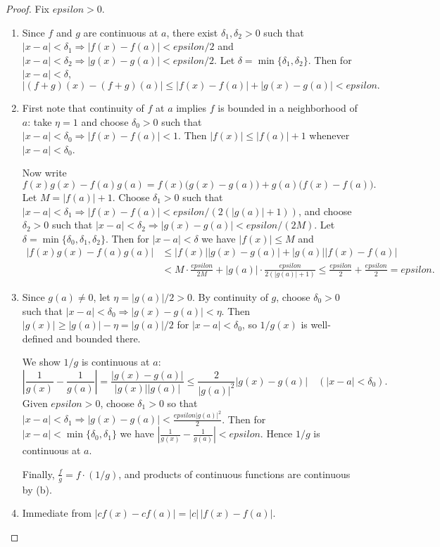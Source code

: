 \documentclass[12pt]{article}
\numberwithin{equation}{section}
\def\abs#1{|#1|}
\def\eps{epsilon}
\DeclarePairedDelimiter{\abs}{\lvert}{\rvert}
\newcommand{\eps}{\varepsilon}               %
\theoremstyle{plain}
\theoremstyle{definition}
\theoremstyle{remark}
\begin{document}
\begin{proof}
Fix $\eps>0$.
\begin{enumerate}[label=(\alph*)]
\item Since $f$ and $g$ are continuous at $a$, there exist $\delta_1,\delta_2>0$ such that
$\abs{x-a}<\delta_1\Rightarrow \abs{f(x)-f(a)}<\eps/2$ and
$\abs{x-a}<\delta_2\Rightarrow \abs{g(x)-g(a)}<\eps/2$.
Let $\delta=\min\{\delta_1,\delta_2\}$. Then for $\abs{x-a}<\delta$,
\[
\abs{(f+g)(x)-(f+g)(a)}\le \abs{f(x)-f(a)}+\abs{g(x)-g(a)}<\eps.
\]

\item First note that continuity of $f$ at $a$ implies $f$ is bounded in a neighborhood of $a$:
take $\eta=1$ and choose $\delta_0>0$ such that $\abs{x-a}<\delta_0\Rightarrow \abs{f(x)-f(a)}<1$.
Then $\abs{f(x)}\le \abs{f(a)}+1$ whenever $\abs{x-a}<\delta_0$.

Now write
\[
f(x)g(x)-f(a)g(a)
= f(x)\bigl(g(x)-g(a)\bigr)+g(a)\bigl(f(x)-f(a)\bigr).
\]
Let $M=\abs{f(a)}+1$.
Choose $\delta_1>0$ such that $\abs{x-a}<\delta_1\Rightarrow \abs{f(x)-f(a)}<\eps/(2(\abs{g(a)}+1))$,
and choose $\delta_2>0$ such that $\abs{x-a}<\delta_2\Rightarrow \abs{g(x)-g(a)}<\eps/(2M)$.
Let $\delta=\min\{\delta_0,\delta_1,\delta_2\}$.
Then for $\abs{x-a}<\delta$ we have $\abs{f(x)}\le M$ and
\begin{align*}
\abs{f(x)g(x)-f(a)g(a)}
&\le \abs{f(x)}\abs{g(x)-g(a)}+\abs{g(a)}\abs{f(x)-f(a)}\\
&< M\cdot \frac{\eps}{2M} + \abs{g(a)}\cdot \frac{\eps}{2(\abs{g(a)}+1)}
\le \frac{\eps}{2}+\frac{\eps}{2}=\eps.
\end{align*}

\item Since $g(a)\neq 0$, let $\eta=\abs{g(a)}/2>0$.
By continuity of $g$, choose $\delta_0>0$ such that $\abs{x-a}<\delta_0\Rightarrow \abs{g(x)-g(a)}<\eta$.
Then $\abs{g(x)}\ge \abs{g(a)}-\eta=\abs{g(a)}/2$ for $\abs{x-a}<\delta_0$,
so $1/g(x)$ is well-defined and bounded there.

We show $1/g$ is continuous at $a$:
\[
\left|\frac{1}{g(x)}-\frac{1}{g(a)}\right|
=\frac{\abs{g(x)-g(a)}}{\abs{g(x)}\abs{g(a)}}
\le \frac{2}{\abs{g(a)}^2}\abs{g(x)-g(a)}
\quad (\abs{x-a}<\delta_0).
\]
Given $\eps>0$, choose $\delta_1>0$ so that $\abs{x-a}<\delta_1\Rightarrow
\abs{g(x)-g(a)}<\frac{\eps\abs{g(a)}^2}{2}$.
Then for $\abs{x-a}<\min\{\delta_0,\delta_1\}$ we have
$\abs{\frac{1}{g(x)}-\frac{1}{g(a)}}<\eps$.
Hence $1/g$ is continuous at $a$.

Finally, $\frac{f}{g}=f\cdot (1/g)$, and products of continuous functions are continuous by (b).

\item Immediate from $\abs{cf(x)-cf(a)}=\abs{c}\,\abs{f(x)-f(a)}$.
\end{enumerate}
\end{proof}
\end{document}
